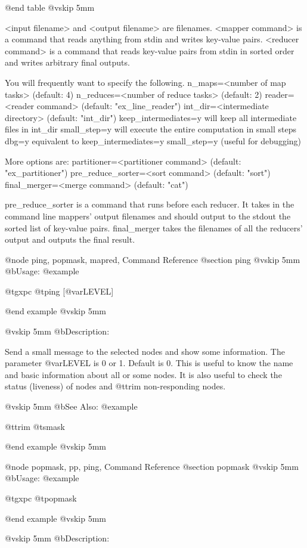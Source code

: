 @end table
@vskip 5mm

<input filename> and <output filename> are filenames.
<mapper command> is a command that reads anything from stdin and 
writes key-value pairs.
<reducer command> is a command that reads key-value pairs from stdin 
in sorted order and writes arbitrary final outputs.

You will frequently want to specify the following.
  n_maps=<number of map tasks>       (default: 4)
  n_reduces=<number of reduce tasks> (default: 2)
  reader=<reader command>            (default: "ex_line_reader")
  int_dir=<intermediate directory>   (default: "int_dir")
  keep_intermediates=y  will keep all intermediate files in int_dir
  small_step=y  will execute the entire computation in small steps
  dbg=y   equivalent to keep_intermediates=y small_step=y (useful for debugging)

More options are:
  partitioner=<partitioner command>  (default: "ex_partitioner")
  pre_reduce_sorter=<sort command>   (default: "sort")
  final_merger=<merge command>       (default: "cat")

pre_reduce_sorter is a command that runs before each reducer.
It takes in the command line mappers' output filenames and should
output to the stdout the sorted list of key-value pairs.
final_merger takes the filenames of all the reducers' output and
outputs the final result.


@node ping, popmask, mapred, Command Reference
@section ping
@vskip 5mm
@b{Usage:}
@example

  @t{gxpc} @t{ping} [@var{LEVEL}]

@end example
@vskip 5mm

@vskip 5mm
@b{Description:}


  Send a small message to the selected nodes and show some
information. The parameter @var{LEVEL} is 0 or 1. Default is 0.
This is useful to know the name and basic information about
all or some nodes. It is also useful to check the status (liveness)
of nodes and @t{trim} non-responding nodes.

@vskip 5mm
@b{See Also:}
@example

  @t{trim} @t{smask}

@end example
@vskip 5mm

@node popmask, pp, ping, Command Reference
@section popmask
@vskip 5mm
@b{Usage:}
@example

  @t{gxpc} @t{popmask}

@end example
@vskip 5mm

@vskip 5mm
@b{Description:}


